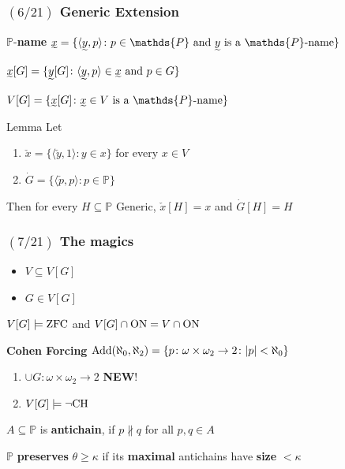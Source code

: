 \documentclass{beamer}
\newcommand{\on}{{\rm{ON}}}
\newcommand{\p}{\mathds{P}}
\newcommand{\zfc}{\rm{ZFC}}
\newcommand{\ch}{\rm{CH}}
\newcommand{\op}[2]{\langle #1, #2 \rangle}
\newcommand{\prg}[1]{#1[G]}
\newcommand{\prh}[1]{#1[H]}
\newcommand{\add}[2]{{\rm{Add}}(#1, #2)}
\begin{document}
\begin{frame}
\frametitle{$(6/21)$ \hspace{15mm} Generic Extension}
\begin{alertblock}{$\p$-\textbf{name}}
$\undertilde{x}=\lbrace \op{\undertilde{y}}{p}\colon p \in \p \text{ and }\undertilde{y}\text{ is a $\p$-name}\rbrace$
\end{alertblock}
\pause
\begin{definition}
$\prg{\undertilde{x}}=\lbrace \prg{\undertilde{y}} \colon \op{\undertilde{y}}{p}\in \undertilde{x}\text{ and } p \in G \rbrace $
\end{definition}
\pause
\begin{definition}
$\prg{V}=\lbrace \prg{\undertilde{x}}\colon \undertilde{x}\in V \text{ is a $\p$-name}\rbrace$
\end{definition}
\pause
\begin{alertblock}{Lemma}
Let
\begin{enumerate}
\item $\check{x}=\lbrace \op{\check{y}}{1}\colon y \in x \rbrace$ for every $x \in V$
\item $\dot{G}= \lbrace \op{\check{p}}{p} \colon p \in \p \rbrace$
\end{enumerate}
Then for every $H \subseteq \p$ Generic, $\prh{\check{x}}=x$ and $\prh{\dot{G}}=H $
\end{alertblock}
\end{frame}
\begin{frame}
\frametitle{$(7/21)$ \hspace{20mm} The magics}
\begin{corollary}
\begin{itemize}
\item $V \subseteq \prg{V}$
\item  $G \in \prg{V}$
\end{itemize}
\end{corollary}
\pause
\begin{theorem}
$\prg{V} \models \zfc $ and $\prg{V} \cap \on = V \cap \on$
\end{theorem}
\pause
\begin{alertblock}{\textbf{Cohen Forcing}}
$\add{\aleph_0}{\aleph_2}=\lbrace p \colon \omega \times \omega_2 \rightarrow 2 \colon |p|<\aleph_0 \rbrace$
\end{alertblock}
\begin{block}{}
\begin{enumerate}
\item $\cup G \colon \omega \times \omega_2 \longrightarrow 2$ \textbf{NEW}!
\item $\prg{V}\models\neg\ch$
\end{enumerate}
\end{block}
\pause
\begin{block}{}
$A \subseteq \p$ is \textbf{antichain}, if $ p\nparallel q$ for all $p, q \in A$

$\p$ \textbf{preserves} $\theta \geq \kappa$ if its \textbf{maximal} antichains have \textbf{size} $<\kappa$
\end{block}
\end{frame}
\end{document}
